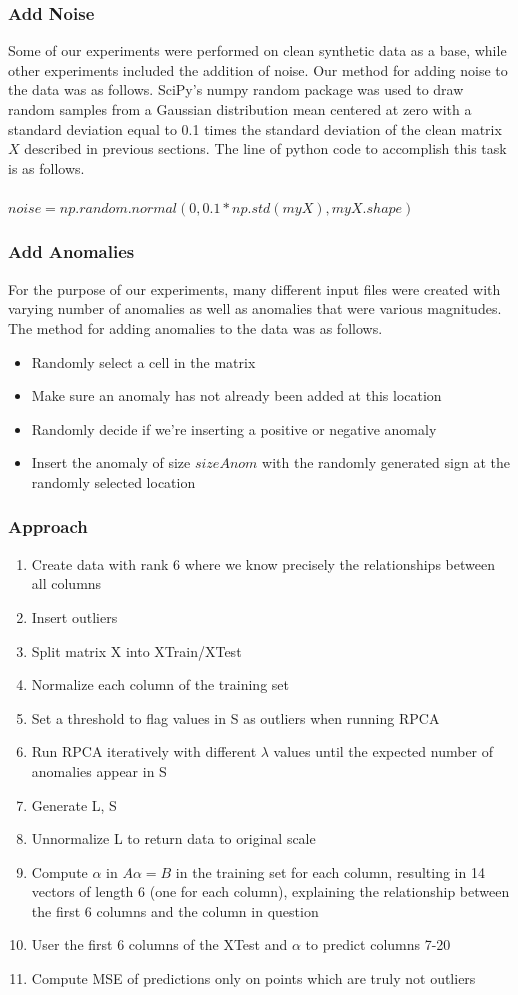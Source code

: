 \documentclass{article}
\begin{document}
\subsubsection{Add Noise}
Some of our experiments were performed on clean synthetic data as a base, while other experiments included the addition of noise. Our method for adding noise to the data was as follows. SciPy's numpy random package was used to draw random samples from a Gaussian distribution mean centered at zero with a standard deviation equal to 0.1 times the standard deviation of the clean matrix $X$ described in previous sections. The line of python code to accomplish this task is as follows.\\\\
$noise = np.random.normal(0, 0.1*np.std(myX), myX.shape)$
\subsubsection{Add Anomalies}
For the purpose of our experiments, many different input files were created with varying number of anomalies as well as anomalies that were various magnitudes. The method for adding anomalies to the data was as follows.
\begin{itemize}
\item Randomly select a cell in the matrix
\item Make sure an anomaly has not already been added at this location
\item Randomly decide if we're inserting a positive or negative anomaly
\item Insert the anomaly of size $sizeAnom$ with the randomly generated sign at the randomly selected location
\end{itemize}
\subsubsection{Approach}
\begin{enumerate}
\item Create data with rank 6 where we know precisely the relationships between all columns
\item Insert outliers
\item Split matrix X into XTrain/XTest
\item Normalize each column of the training set
\item Set a threshold to flag values in S as outliers when running RPCA
\item Run RPCA iteratively with different $\lambda$ values until the expected number of anomalies appear in S
\item Generate L, S
\item Unnormalize L to return data to original scale
\item Compute $\alpha$ in $A\alpha = B$ in the training set for each column, resulting in 14 vectors of length 6 (one for each column), explaining the relationship between the first 6 columns and the column in question
\item User the first 6 columns of the XTest and $\alpha$ to predict columns 7-20
\item Compute MSE of predictions only on points which are truly not outliers
\end{enumerate}
\end{document}
